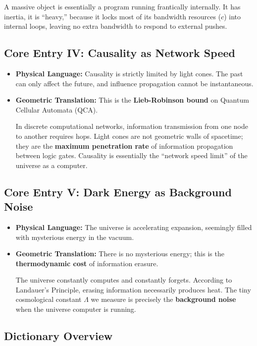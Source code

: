 \documentclass[11pt,a4paper,twoside]{book}
\begin{document}
A massive object is essentially a program running frantically internally. It has inertia, it is ``heavy,'' because it locks most of its bandwidth resources ($c$) into internal loops, leaving no extra bandwidth to respond to external pushes.

\subsection{Core Entry IV: Causality as Network Speed}

\begin{itemize}
\item \textbf{Physical Language:} Causality is strictly limited by light cones. The past can only affect the future, and influence propagation cannot be instantaneous.

\item \textbf{Geometric Translation:} This is the \textbf{Lieb-Robinson bound} on Quantum Cellular Automata (QCA).

In discrete computational networks, information transmission from one node to another requires hops. Light cones are not geometric walls of spacetime; they are the \textbf{maximum penetration rate} of information propagation between logic gates. Causality is essentially the ``network speed limit'' of the universe as a computer.
\end{itemize}

\subsection{Core Entry V: Dark Energy as Background Noise}

\begin{itemize}
\item \textbf{Physical Language:} The universe is accelerating expansion, seemingly filled with mysterious energy in the vacuum.

\item \textbf{Geometric Translation:} There is no mysterious energy; this is the \textbf{thermodynamic cost} of information erasure.

The universe constantly computes and constantly forgets. According to Landauer's Principle, erasing information necessarily produces heat. The tiny cosmological constant $\Lambda$ we measure is precisely the \textbf{background noise} when the universe computer is running.
\end{itemize}

\subsection{Dictionary Overview}
\end{document}
